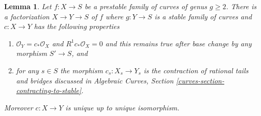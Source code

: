 \documentclass{stacks-project}
\theoremstyle{plain}
\newtheorem{lemma}[subsection]{Lemma}
\theoremstyle{definition}
\theoremstyle{remark}
\numberwithin{equation}{subsection}
\begin{document}
\begin{lemma}
\label{lemma-contract-prestable-to-stable}
Let $f : X \to S$ be a prestable family of curves of genus $g \geq 2$.
There is a factorization $X \to Y \to S$ of $f$ where $g : Y \to S$
is a stable family of curves and $c : X \to Y$ has the following
properties
\begin{enumerate}
\item $\mathcal{O}_Y = c_*\mathcal{O}_X$ and $R^1c_*\mathcal{O}_X = 0$
and this remains true after base change by any morphism $S' \to S$, and
\item for any $s \in S$ the morphism $c_s : X_s \to Y_s$ is the
contraction of rational tails and bridges discussed in
Algebraic Curves, Section \ref{curves-section-contracting-to-stable}.
\end{enumerate}
Moreover $c : X \to Y$ is unique up to unique isomorphism.
\end{lemma}
\end{document}

